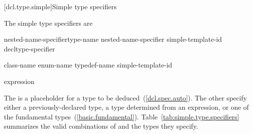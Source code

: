 [dcl.type.simple]{Simple type specifiers}%

\pnum
The simple type specifiers are

\begin{bnf}
\br
    nested-name-specifier\opt type-name\br
    nested-name-specifier  simple-template-id\br
    \br
    \br
    \br
    \br
    \br
    \br
    \br
    \br
    \br
    \br
    \br
    \br
    \br
    \br
    decltype-specifier
\end{bnf}

\begin{bnf}
\br
    class-name\br
    enum-name\br
    typedef-name\br
    simple-template-id
\end{bnf}

\begin{bnf}
\br
   \terminal{(} expression \terminal{)}\br
   \terminal{(}  \terminal{)}
\end{bnf}

\pnum
{}%
%
%
%
%
%
%
%
%
%
%
%
%
%
%
%
%
The   is a placeholder for a type to be
deduced~(\ref{dcl.spec.auto}).
The other
specify either a previously-declared type, a type determined from an
expression, or one of the
fundamental types~(\ref{basic.fundamental}).
Table~\ref{tab:simple.type.specifiers}
 summarizes the valid combinations of
and the types they specify.

